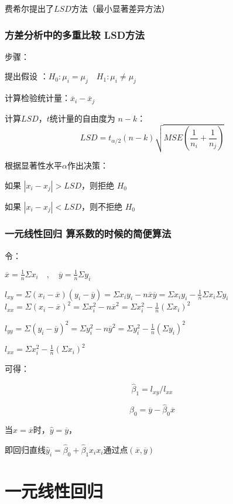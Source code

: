 \documentclass[UTF8,10pt]{book}
\begin{document}
费希尔提出了$ LSD $方法（最小显著差异方法）

\subsection{方差分析中的多重比较 LSD方法}	
步骤： 

提出假设 ：$ H_0:\mu_i = \mu_j \quad H_1:\mu_i \neq \mu_j $

计算检验统计量：$\overline{x}_i-\overline{x}_j$

计算$LSD$，$t$统计量的自由度为
$n-k$： 
$$ LSD = t_{\alpha / 2}(n-k) \sqrt{MSE \left( \frac{1}{n_i}+\frac{1}{n_j}\right)} $$ 

根据显著性水平$\alpha$作出决策：

如果 $ |x_i - x_j| > LSD$，则拒绝 $ H_0$

如果 $ |x_i - x_j| < LSD$，则不拒绝 $ H_0$

\subsection{一元线性回归 算系数的时候的简便算法}	
令： 

$ \overline{x}=\frac{1}{n}\Sigma x_i \quad , \quad \overline{y}=\frac{1}{n}\Sigma y_i $ 

$ l_{xy} = \Sigma(x_i-\overline{x})(y_i-\overline{y}) = \Sigma x_i y_i - n\overline{x}\overline{y} = \Sigma x_i y_i - \frac{1}{n}\Sigma x_i \Sigma y_i $ $ l_{xx} = \Sigma (x_i - \overline{x})^2 = \Sigma x_i^2 - n \overline{x}^2= \Sigma x_i^2 - \frac{1}{n}(\Sigma x_i)^2 $ 

$ l_{yy} = \Sigma (y_i - \overline{y})^2 = \Sigma y_i^2 - n \overline{y}^2= \Sigma y_i^2 - \frac{1}{n}(\Sigma y_i)^2 $ 

$ l_{xx} = \Sigma x_i^2 - \frac{1}{n} (\Sigma x_i)^2 $

可得： 

$$ \hat{\beta}_1 = l_{xy} / l_{xx} $$ 

$$ \hat{\beta}_0 = \overline{y} - \hat{\beta}_0 \overline{x} $$ 

当$x=\overline{x}$时，$\hat{y}=\overline{y}$，

即回归直线$\hat{y}_i=\hat{\beta}_0+\hat{\beta}_1 x_i x_i$通过点$(\overline{x},\overline{y})$

\clearpage

\chapter{一元线性回归}
\end{document}
